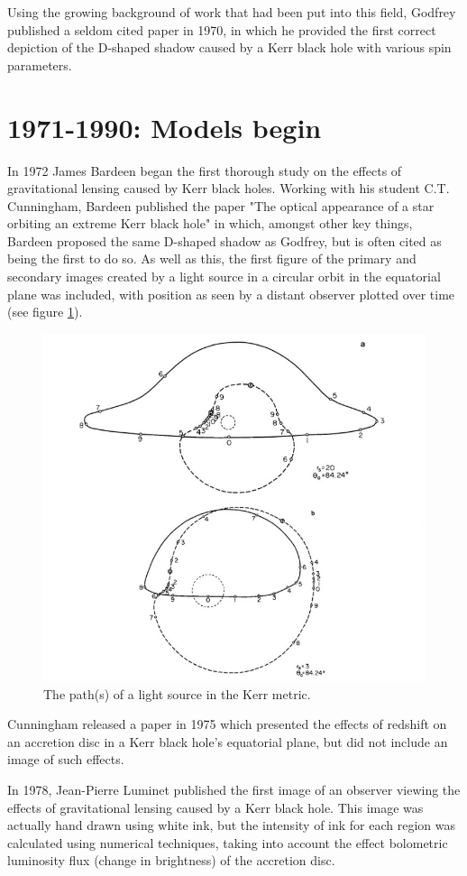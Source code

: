 \documentclass[oneside,openright,frontopenright, singlespacing]{dmathesis}
\begin{document}
\vspace{1em}
	Using the growing background of work that had been put into this field, Godfrey published a seldom cited paper in 1970, in which he provided the first correct depiction of the D-shaped shadow caused by a Kerr black hole with various spin parameters\cite{godfrey1970mach}.

\section{1971-1990: Models begin}\label{sec:Section1.2}

	In 1972 James Bardeen began the first thorough study on the effects of gravitational lensing caused by Kerr black holes\cite{bardeen1973timelike}. Working with his student C.T. Cunningham, Bardeen published the paper "The optical appearance of a star orbiting an extreme Kerr black hole"\cite{cunningham1973optical} in which, amongst other key things, Bardeen proposed the same D-shaped shadow as Godfrey, but is often cited as being the first to do so. As well as this, the first figure of the primary and secondary images created by a light source in a circular orbit in the equatorial plane was included, with position as seen by a distant observer plotted over time (see figure \ref{fig:Figure1.1}).

\begin{figure}[!ht]
	\centering
	\includegraphics[width=0.4\linewidth]{img/Cunningham-Bardeen-1973-2images-2}
	\caption{The path(s) of a light source in the Kerr metric. \cite{cunningham1973optical}}
	\label{fig:Figure1.1}
\end{figure}

\vspace{1em}
	Cunningham released a paper in 1975 which presented the effects of redshift on an accretion disc in a Kerr black hole's equatorial plane\cite{cunningham1975effects}, but did not include an image of such effects.

\vspace{1em}
	In 1978, Jean-Pierre Luminet published the first image of an observer viewing the effects of gravitational lensing caused by a Kerr black hole\cite{luminet1979image}. This image was actually hand drawn using white ink, but the intensity of ink for each region was calculated using numerical techniques, taking into account the effect bolometric luminosity flux (change in brightness) of the accretion disc.
\end{document}
